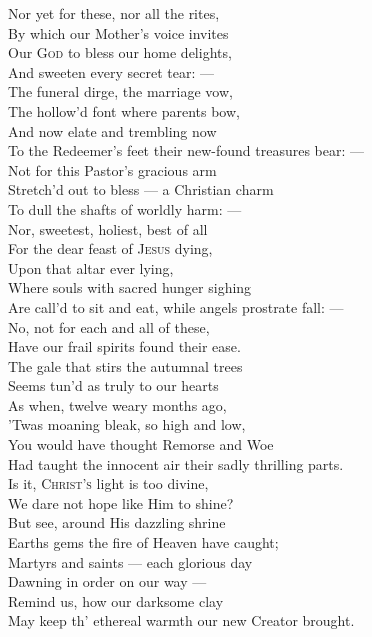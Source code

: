   Nor yet for these, nor all the rites, \\
 By which our Mother’s voice invites \\
 Our \textsc{God} to bless our home delights, \\
 And sweeten every secret tear: — \\
 The funeral dirge, the marriage vow, \\
 The hollow’d font where parents bow, \\
 And now elate and trembling now \\
 To the Redeemer’s feet their new-found treasures bear: — \\
  Not for this Pastor’s gracious arm \\
 Stretch’d out to bless — a Christian charm \\
 To dull the shafts of worldly harm: — \\
 Nor, sweetest, holiest, best of all \\
 For the dear feast of \textsc{Jesus} dying, \\
 Upon that altar ever lying, \\
 Where souls with sacred hunger sighing \\
 Are call’d to sit and eat, while angels prostrate fall: — \\
  No, not for each and all of these, \\
 Have our frail spirits found their ease. \\
 The gale that stirs the autumnal trees \\
 Seems tun’d as truly to our hearts \\
 As when, twelve weary months ago, \\
 ’Twas moaning bleak, so high and low, \\
 You would have thought Remorse and Woe \\
 Had taught the innocent air their sadly thrilling parts. \\
  Is it, \textsc{Christ’s} light is too divine, \\
 We dare not hope like Him to shine? \\
 But see, around His dazzling shrine \\
 Earths gems the fire of Heaven have caught; \\
 Martyrs and saints — each glorious day \\
 Dawning in order on our way — \\
 Remind us, how our darksome clay \\
 May keep th’ ethereal warmth our new Creator brought. \\

